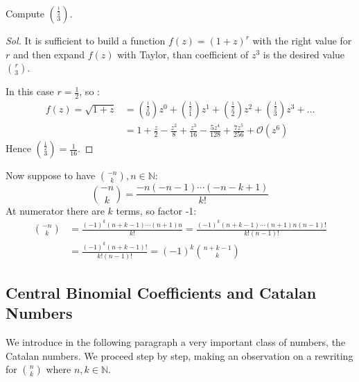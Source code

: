 \begin{exercise}
  \label{exercise:first-on-comb-with-real}
  Compute ${{ \frac{1}{2} }\choose{3}} $.
\end{exercise}
\begin{proof}[Sol]
  It is sufficient to build a function $f(z) = (1+z)^r$ with the right
  value for $r$ and then expand $f(z)$ with Taylor, than coefficient of
  $z^3$ is the desired value ${{ r }\choose{3}} $.

  In this case $r= \frac{1}{2} $, so :
  \begin{displaymath}
      \begin{split}
          f(z) = \sqrt{1+z} &=
          {{\frac{1}{2}}\choose{0}}z^0 + {{\frac{1}{2}}\choose{1}}z^1 +
          {{\frac{1}{2}}\choose{2}}z^2 + {{\frac{1}{2}}\choose{3}}z^3 + \ldots \\
          &= 1 + \frac{z}{2} - \frac{z^{2}}{8} + \frac{z^{3}}{16} - \frac{5 z^{4}}{128} + \frac{7 z^{5}}{256} + \mathcal{O}\left(z^{6}\right)
      \end{split}
  \end{displaymath}
  Hence $ { \frac{1}{2} \choose {3} } = \frac{1}{16}$.

\end{proof}

Now suppose to have ${{-n}\choose{k}}, n\in \mathbb{N}  $:
\begin{displaymath}
  {{-n}\choose{k}} =  \frac{-n(-n-1)\cdots(-n-k+1)}{k!}
\end{displaymath}
At numerator there are $k$ terms, so factor -1:
\begin{displaymath}
  \begin{split}
    {{-n}\choose{k}} &= \frac{(-1)^k (n + k-1)\cdots(n+1)n}{k!} =
    \frac{(-1)^k (n + k-1)\cdots(n+1)n(n-1)!}{k!(n-1)!}\\
    &= \frac{(-1)^k (n + k-1)!}{k!(n-1)!} = (-1)^k {{n+k-1}\choose{k}}
  \end{split}
\end{displaymath}

\subsection{Central Binomial Coefficients and Catalan Numbers}

We introduce in the following paragraph a very important class of
numbers, the Catalan numbers. We proceed step by step, making an
observation on a rewriting for ${{n}\choose{k}}$ where $n,k\in
\mathbb{N} $.


